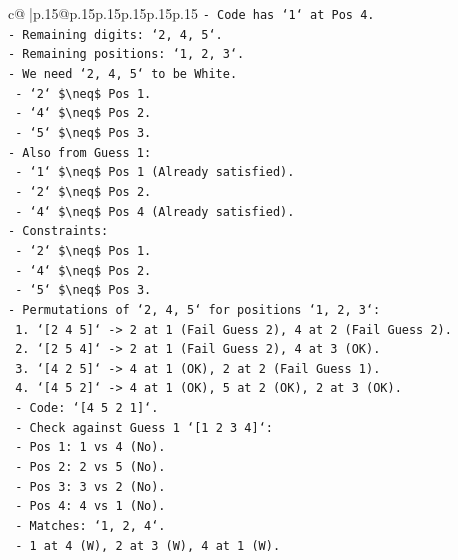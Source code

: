 \documentclass{article}
\begin{document}
{\begin{supertabular}{c@{$\;$}|p{.15\linewidth}@{}p{.15\linewidth}p{.15\linewidth}p{.15\linewidth}p{.15\linewidth}p{.15\linewidth}}
{{{\texttt{{-} Code has `1` at Pos 4.} \\
\texttt{{-} Remaining digits: `2, 4, 5`.} \\
\texttt{{-} Remaining positions: `1, 2, 3`.} \\
\texttt{{-} We need `2, 4, 5` to be White.} \\
\texttt{    {-} `2` \$\textbackslash{}neq\$ Pos 1.} \\
\texttt{    {-} `4` \$\textbackslash{}neq\$ Pos 2.} \\
\texttt{    {-} `5` \$\textbackslash{}neq\$ Pos 3.} \\
\texttt{{-} Also from Guess 1:} \\
\texttt{    {-} `1` \$\textbackslash{}neq\$ Pos 1 (Already satisfied).} \\
\texttt{    {-} `2` \$\textbackslash{}neq\$ Pos 2.} \\
\texttt{    {-} `4` \$\textbackslash{}neq\$ Pos 4 (Already satisfied).} \\
\texttt{{-} Constraints:} \\
\texttt{    {-} `2` \$\textbackslash{}neq\$ Pos 1.} \\
\texttt{    {-} `4` \$\textbackslash{}neq\$ Pos 2.} \\
\texttt{    {-} `5` \$\textbackslash{}neq\$ Pos 3.} \\
\texttt{{-} Permutations of `2, 4, 5` for positions `1, 2, 3`:} \\
\texttt{    1. `{[}2 4 5{]}` {-}> 2 at 1 (Fail Guess 2), 4 at 2 (Fail Guess 2).} \\
\texttt{    2. `{[}2 5 4{]}` {-}> 2 at 1 (Fail Guess 2), 4 at 3 (OK).} \\
\texttt{    3. `{[}4 2 5{]}` {-}> 4 at 1 (OK), 2 at 2 (Fail Guess 1).} \\
\texttt{    4. `{[}4 5 2{]}` {-}> 4 at 1 (OK), 5 at 2 (OK), 2 at 3 (OK).} \\
\texttt{       {-} Code: `{[}4 5 2 1{]}`.} \\
\texttt{       {-} Check against Guess 1 `{[}1 2 3 4{]}`:} \\
\texttt{         {-} Pos 1: 1 vs 4 (No).} \\
\texttt{         {-} Pos 2: 2 vs 5 (No).} \\
\texttt{         {-} Pos 3: 3 vs 2 (No).} \\
\texttt{         {-} Pos 4: 4 vs 1 (No).} \\
\texttt{         {-} Matches: `1, 2, 4`.} \\
\texttt{         {-} 1 at 4 (W), 2 at 3 (W), 4 at 1 (W).} \\
}}}
\end{supertabular}}
\end{document}
